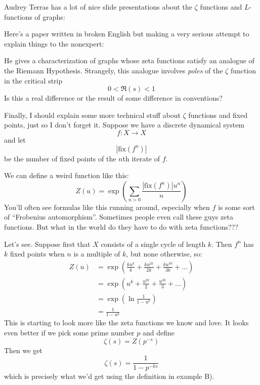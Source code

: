 \documentclass{article}
\def\tightlist{}
\renewcommand{\texttt}[1]{%
  \begingroup
  \ttfamily
  \begingroup\lccode`~=`/\lowercase{\endgroup\def~}{/\discretionary{}{}{}}%
  \begingroup\lccode`~=`[\lowercase{\endgroup\def~}{[\discretionary{}{}{}}%
  \begingroup\lccode`~=`.\lowercase{\endgroup\def~}{.\discretionary{}{}{}}%
  \catcode`/=\active\catcode`[=\active\catcode`.=\active
  \scantokens{#1\noexpand}%
  \endgroup
}
\begin{document}
Audrey Terras has a lot of nice slide presentations about the \(\zeta\)
functions and \(L\)-functions of graphs:


Here's a paper written in broken English but making a very serious
attempt to explain things to the nonexpert:


He gives a characterization of graphs whose zeta functions satisfy an
analogue of the Riemann Hypothesis. Strangely, this analogue involves
\emph{poles} of the \(\zeta\) function in the critical strip
\[0 < \Re(s) < 1\] Is this a real difference or the result of some
difference in conventions?

Finally, I should explain some more technical stuff about \(\zeta\)
functions and fixed points, just so I don't forget it. Suppose we have a
discrete dynamical system \[f\colon X \to X\] and let
\[|\mathrm{fix}(f^n)|\] be the number of fixed points of the \(n\)th
iterate of \(f\).

We can define a weird function like this:
\[Z(u) = \exp\left(\sum_{n>0} \frac{|\mathrm{fix}(f^n)| u^n}{n}\right)\]
You'll often see formulas like this running around, especially when
\(f\) is some sort of ``Frobenius automorphism''. Sometimes people even
call these guys zeta functions. But what in the world do they have to do
with zeta functions???

Let's see. Suppose first that \(X\) consists of a single cycle of length
\(k\). Then \(f^n\) has \(k\) fixed points when \(n\) is a multiple of
\(k\), but none otherwise, so: \[
  \begin{aligned}
    Z(u)
    &= \exp\left(\frac{ku^k}{k} + \frac{ku^{2k}}{2k} + \frac{ku^{3k}}{3k} + \ldots\right)
  \\&= \exp\left(u^k + \frac{u^{2k}}{2} + \frac{u^{3k}}{3} + \ldots\right)
  \\&= \exp\left(\ln\frac{1}{1-u^k}\right)
  \\&= \frac{1}{1-u^k}
  \end{aligned}
\] This is starting to look more like the zeta functions we know and
love. It looks even better if we pick some prime number \(p\) and define
\[\zeta(s) = Z(p^{-s})\] Then we get
\[\zeta(s) = \frac{1}{1 - p^{-ks}}\] which is precisely what we'd get
using the definition in example B).
\end{document}
